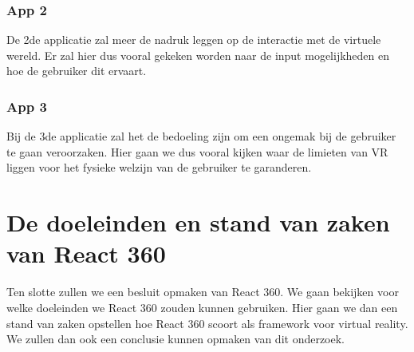 \subsubsection{App 2}
De 2de applicatie zal meer de nadruk leggen op de interactie met de virtuele wereld. Er zal hier dus vooral gekeken worden naar de input mogelijkheden en hoe de gebruiker dit ervaart.
\subsubsection{App 3}
Bij de 3de applicatie zal het de bedoeling zijn om een ongemak bij de gebruiker te gaan veroorzaken. Hier gaan we dus vooral kijken waar de limieten van VR liggen voor het fysieke welzijn van de gebruiker te garanderen.


\section{De doeleinden en stand van zaken van React 360}
\label{sec:doeleinden-reactvr}
Ten slotte zullen we een besluit opmaken van React 360. We gaan bekijken voor welke doeleinden we React 360 zouden kunnen gebruiken. Hier gaan we dan een stand van zaken opstellen hoe React 360 scoort als framework voor virtual reality. We zullen dan ook een conclusie kunnen opmaken van dit onderzoek.



